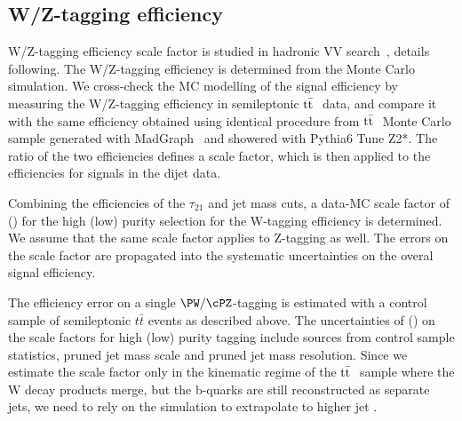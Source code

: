 \subsection{W/Z-tagging efficiency}
\label{sec:vtageff}

W/Z-tagging efficiency scale factor is studied in hadronic
 VV search~\cite{CMS:2013fea, JME-13-006}, details following.
The W/Z-tagging efficiency is determined from the Monte Carlo simulation.
We cross-check the MC modelling of the signal efficiency by measuring the W/Z-tagging efficiency
in semileptonic $\mathrm{t}\bar{\mathrm{t}}~$ data, and compare it
with the same efficiency obtained using identical 
procedure from $\mathrm{t}\bar{\mathrm{t}}~$ Monte Carlo sample generated 
with MadGraph~\cite{madgraph} and showered with Pythia6 Tune Z2*.
The ratio of the two efficiencies defines a scale factor, which is then applied to
the efficiencies for signals in the dijet data.

Combining the efficiencies of the $\tau_{21}$ and jet mass cuts,
 a data-MC scale factor of  \scalefactorHP
(\scalefactorLP) for the high (low) purity selection for the  W-tagging efficiency is determined.
We assume that the same scale factor applies to Z-tagging as well.
The errors on the scale factor are propagated
into the systematic uncertainties on the overal signal efficiency.





The efficiency error on a single $\PW/\cPZ$-tagging is estimated with
a control sample of semileptonic $t \bar t$ events as described above.
The uncertainties of \scalefactorHPu (\scalefactorLPu) on the scale
factors for high (low) purity tagging include sources from control
sample statistics, pruned jet mass scale and pruned jet mass
resolution.
Since we estimate the scale factor
only in the kinematic regime of the $\mathrm{t}\bar{\mathrm{t}}~$ sample where the W decay
products merge, but the b-quarks are still reconstructed as separate
jets, we need to rely on the simulation to extrapolate to
higher jet \pt.


